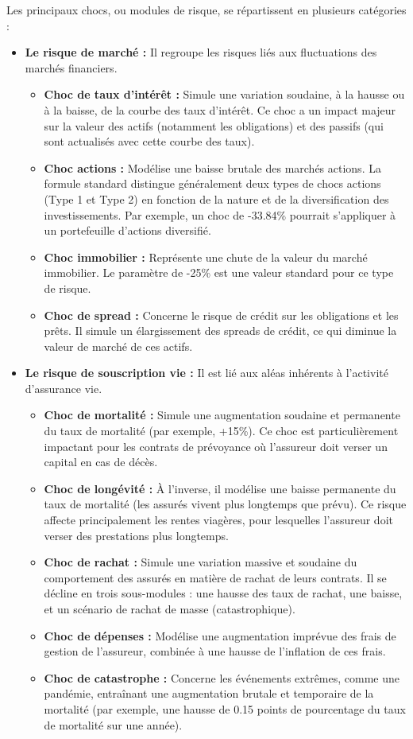 Les principaux chocs, ou modules de risque, se répartissent en plusieurs catégories :

\begin{itemize} 
    \item \textbf{Le risque de marché :} Il regroupe les risques liés aux fluctuations des marchés financiers. 
    \begin{itemize} 
        \item \textbf{Choc de taux d'intérêt :} Simule une variation soudaine, à la hausse ou à la baisse, de la courbe des taux d'intérêt. Ce choc a un impact majeur sur la valeur des actifs (notamment les obligations) et des passifs (qui sont actualisés avec cette courbe des taux). 
        \item \textbf{Choc actions :} Modélise une baisse brutale des marchés actions. La formule standard distingue généralement deux types de chocs actions (Type 1 et Type 2) en fonction de la nature et de la diversification des investissements. Par exemple, un choc de -33.84\% pourrait s'appliquer à un portefeuille d'actions diversifié. 
        \item \textbf{Choc immobilier :} Représente une chute de la valeur du marché immobilier. Le paramètre de -25\% est une valeur standard pour ce type de risque. 
        \item \textbf{Choc de spread :} Concerne le risque de crédit sur les obligations et les prêts. Il simule un élargissement des spreads de crédit, ce qui diminue la valeur de marché de ces actifs. 
    \end{itemize}

\item \textbf{Le risque de souscription vie :} Il est lié aux aléas inhérents à l'activité d'assurance vie.
\begin{itemize}
\item \textbf{Choc de mortalité :} Simule une augmentation soudaine et permanente du taux de mortalité (par exemple, +15\%). Ce choc est particulièrement impactant pour les contrats de prévoyance où l'assureur doit verser un capital en cas de décès.
\item \textbf{Choc de longévité :} À l'inverse, il modélise une baisse permanente du taux de mortalité (les assurés vivent plus longtemps que prévu). Ce risque affecte principalement les rentes viagères, pour lesquelles l'assureur doit verser des prestations plus longtemps.
\item \textbf{Choc de rachat :} Simule une variation massive et soudaine du comportement des assurés en matière de rachat de leurs contrats. Il se décline en trois sous-modules : une hausse des taux de rachat, une baisse, et un scénario de rachat de masse (catastrophique).
\item \textbf{Choc de dépenses :} Modélise une augmentation imprévue des frais de gestion de l'assureur, combinée à une hausse de l'inflation de ces frais.
\item \textbf{Choc de catastrophe :} Concerne les événements extrêmes, comme une pandémie, entraînant une augmentation brutale et temporaire de la mortalité (par exemple, une hausse de 0.15 points de pourcentage du taux de mortalité sur une année).
\end{itemize}


\end{itemize}
